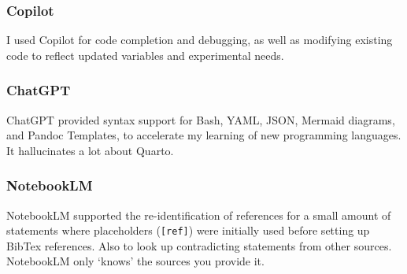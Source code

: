 \documentclass[
  11pt,
  a4paper,
]{scrbook}
\begin{document}
\subsubsection*{Copilot}\label{copilot}

I used Copilot for code completion and debugging, as well as modifying
existing code to reflect updated variables and experimental needs.

\subsubsection*{ChatGPT}\label{chatgpt}

ChatGPT provided syntax support for Bash, YAML, JSON, Mermaid diagrams,
and Pandoc Templates, to accelerate my learning of new programming
languages. It hallucinates a lot about Quarto.

\subsubsection*{NotebookLM}\label{notebooklm}

NotebookLM supported the re-identification of references for a small
amount of statements where placeholders (\texttt{{[}ref{]}}) were
initially used before setting up BibTex references. Also to look up
contradicting statements from other sources. NotebookLM only `knows' the
sources you provide it.


\backmatter
\end{document}
